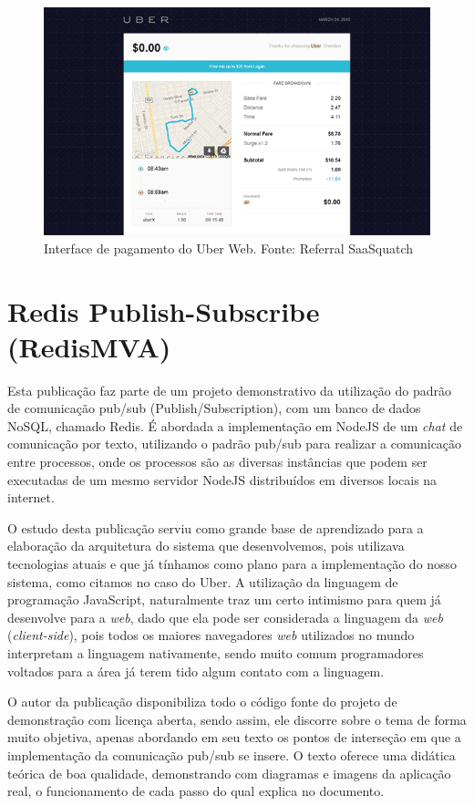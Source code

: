 \begin{figure}[H]
	\centering
	\includegraphics[scale=0.7]{imagens/uber2.png}
	\caption{\small Interface de pagamento do Uber Web. Fonte: Referral SaaSquatch \cite{uber-imgs}}
	\label{fig:uber-payment-interface}
\end{figure}

\section{Redis Publish-Subscribe (RedisMVA) }
Esta publicação \cite{redis-pubsub-redismva} faz parte de um projeto demonstrativo da utilização do padrão de comunicação pub/sub (Publish/Subscription), com um banco de dados NoSQL, chamado Redis. É abordada a implementação em NodeJS de um \textit{chat} de comunicação por texto, utilizando o padrão pub/sub para realizar a comunicação entre processos, onde os processos são as diversas instâncias que podem ser executadas de um mesmo servidor NodeJS distribuídos em diversos locais na internet.

O estudo desta publicação serviu como grande base de aprendizado para a elaboração da arquitetura do sistema que desenvolvemos, pois utilizava tecnologias atuais e que já tínhamos como plano para a implementação do nosso sistema, como citamos no caso do Uber. A utilização da linguagem de programação JavaScript, naturalmente traz um certo intimismo para quem já desenvolve para a \textit{web}, dado que ela pode ser considerada a linguagem da \textit{web} (\textit{client-side}), pois todos os maiores navegadores \textit{web} \cite{browsers-usage} utilizados no mundo interpretam a linguagem nativamente, sendo muito comum programadores voltados para a área já terem tido algum contato com a linguagem.

O autor da publicação disponibiliza todo o código fonte do projeto de demonstração com licença aberta, sendo assim, ele discorre sobre o tema de forma muito objetiva, apenas abordando em seu texto os pontos de interseção em que a implementação da comunicação pub/sub se insere. O texto oferece uma didática teórica de boa qualidade, demonstrando com diagramas e imagens da aplicação real, o funcionamento de cada passo do qual explica no documento.

